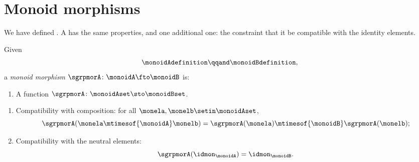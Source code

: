 
\section{Monoid morphisms}
We have defined .
A  has the same properties, and one additional one: the constraint that it be compatible with the identity elements.

\begin{marginfigure}
    \centering
    \caption{Compatibility with identity elements}
    \label{fig:monoid-morphism-diagram}
\end{marginfigure}


\begin{ctdefinition}
    \label{def:monoid-mor}
    Given 
    \begin{equation}
        \monoidAdefinition
        \qqand
        \monoidBdefinition,
    \end{equation}
    a \emph{monoid morphism} $\sgrpmorA\colon \monoidA \fto \monoidB$ is:

    \constit
    \begin{enumerate}
        \item A function $\sgrpmorA \colon \monoidAset \sto \monoidBset$.
    \end{enumerate}

    \condit
    \begin{enumerate}
        \item Compatibility with composition: for all $\monela, \monelb\setin \monoidAset$,
              \begin{equation}
                  \label{eq:mon-mor-comp}
                  \sgrpmorA (\monela \mtimesof{\monoidA} \monelb) = \sgrpmorA (\monela) \mtimesof{\monoidB} \sgrpmorA(\monelb);
              \end{equation}
        \item Compatibility with the neutral elements:
              \begin{equation}
                  \label{eq:mon-id-comp}
                  \sgrpmorA (\idmon_\monoidA) = \idmon_{\monoidB}.
              \end{equation}
    \end{enumerate}
\end{ctdefinition}


